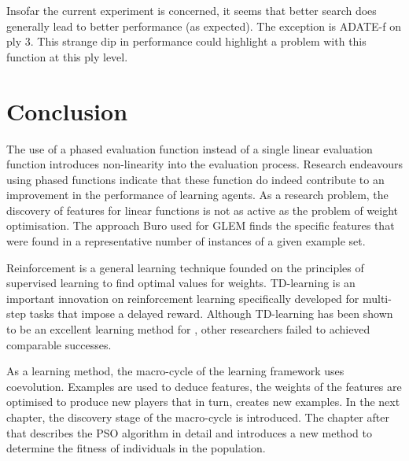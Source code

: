 Insofar the current experiment is concerned, it seems that better search does generally lead to better performance (as expected).  The exception is ADATE-f on ply 3.  This strange dip in performance could highlight a problem with this function at this ply level.    

\section{Conclusion}
\label{sec:learning-conclusion}
The use of a phased evaluation function instead of a single linear evaluation function introduces non-linearity into the evaluation process. Research endeavours using phased functions indicate that these function do indeed contribute to an improvement in the  performance of learning agents.  As a research problem, the discovery of features for linear functions is not as active as the problem of weight optimisation.  The approach Buro used for GLEM finds the specific features that were found in a representative number of instances of a given example set.

Reinforcement is a general learning technique founded on the principles of supervised learning to find optimal values for weights.  TD-learning is an important innovation on reinforcement learning specifically developed for multi-step tasks that impose a delayed reward.  Although TD-learning has been shown to be an excellent learning method for , other researchers failed to achieved comparable successes. %

As a learning method, the macro-cycle of the learning framework uses coevolution.  Examples are used to deduce features, the weights of the features are optimised to produce new players that in turn, creates new examples.  In the next chapter, the discovery stage of the macro-cycle is introduced.  The chapter after that describes the PSO algorithm in detail and introduces a new method to determine the fitness of individuals in the population.   
